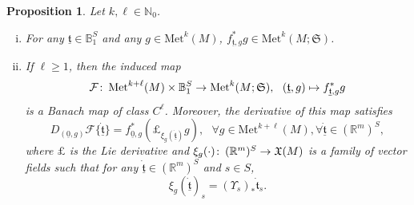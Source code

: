 \documentclass{article}
\numberwithin{equation}{section}        %
\theoremstyle{bfnote}
\newtheorem{prop}[thm]{Proposition}         %
\theoremstyle{definition}
\theoremstyle{bfremark}
\newcommand{\col}{\colon \thinspace}        %
\newcommand{\N}{\mathbb{N}}                 %
\newcommand{\R}{\mathbb{R}}                 %
\newcommand{\Ball}{\mathbb{B}}              %
\newcommand{\Met}{\mathrm{Met}}             %
\begin{document}
\begin{prop}     \label{prop: regularity of pull-back of metrics}
    Let $k, \ell \in \N_0$.
    \begin{enumerate}[(i)]
        \item For any $\underline{\mathfrak{t}} \in \Ball_1^S$ and any $g \in \Met^{k}(M)$, $f_{\underline{\mathfrak{t}},g}^*g \in \Met^{k}(M;\mathfrak{S})$.

        \item If $\ell \geq 1$, then the induced map
        \begin{equation*}
            \mathcal{F} \col \Met^{k+\ell}(M) \times \Ball_1^S \to \Met^k(M;\mathfrak{S}), ~~ (\underline{\mathfrak{t}},g) \mapsto f_{\underline{\mathfrak{t}},g}^* g
        \end{equation*}
        is a Banach map of class $C^\ell$. Moreover, the derivative of this map satisfies
        \begin{equation*}
            D_{(\underline{0},g)} \mathcal{F} \{ \dot{\underline{\mathfrak{t}}} \} = f_{\underline{0},g}^*(\pounds_{\xi_g(\dot{\underline{\mathfrak{t}}})}g), ~~~ \forall g \in \Met^{k+\ell}(M), \forall \dot{\underline{\mathfrak{t}}} \in (\R^m)^S,
        \end{equation*}
        where $\pounds$ is the Lie derivative and $\xi_g(\cdot) \col (\R^m)^S \to \mathfrak{X}(M)$ is a family of vector fields such that for any $\underline{\dot{\mathfrak{t}}} \in (\R^m)^S$ and $s \in S$,
        \begin{equation*}
            \xi_g(\dot{\underline{\mathfrak{t}}})_s = (\Upsilon_s)_* \dot{\mathfrak{t}}_s .
        \end{equation*}
    \end{enumerate}
\end{prop}
\end{document}
